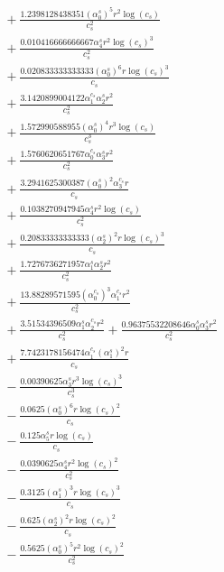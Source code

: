 \documentclass[10pt]{article}
\begin{document}
\begin{align*}
&{}  + \frac{1.2398128438351 \left(\alpha_{0}^s\right)^{5} r^{2} \log{\left(c_{s} \right)}}{c_{s}^{2}} \\
&{}  + \frac{0.010416666666667 \alpha_{4}^s r^{2} \log{\left(c_{s} \right)}^{3}}{c_{s}^{2}} \\
&{}  + \frac{0.020833333333333 \left(\alpha_{0}^s\right)^{6} r \log{\left(c_{s} \right)}^{3}}{c_{s}} \\
&{}  + \frac{3.1420899004122 \alpha_{1}^{c_s} \alpha_{2}^s r^{2}}{c_{s}^{2}} \\
&{}  + \frac{1.572990588955 \left(\alpha_{0}^s\right)^{4} r^{3} \log{\left(c_{s} \right)}}{c_{s}^{3}} \\
&{}  + \frac{1.5760620651767 \alpha_{0}^{c_s} \alpha_{3}^s r^{2}}{c_{s}^{2}} \\
&{}  + \frac{3.2941625300387 \left(\alpha_{0}^s\right)^{2} \alpha_{3}^{c_s} r}{c_{s}} \\
&{}  + \frac{0.1038270947945 \alpha_{4}^s r^{2} \log{\left(c_{s} \right)}}{c_{s}^{2}} \\
&{}  + \frac{0.20833333333333 \left(\alpha_{2}^s\right)^{2} r \log{\left(c_{s} \right)}^{3}}{c_{s}} \\
&{}  + \frac{1.7276736271957 \alpha_{1}^s \alpha_{2}^s r^{2}}{c_{s}^{2}} \\
&{}  + \frac{13.88289571595 \left(\alpha_{0}^{c_s}\right)^{3} \alpha_{1}^{c_s} r^{2}}{c_{s}^{2}} \\
&{}  + \frac{3.51534396509 \alpha_{1}^s \alpha_{2}^{c_s} r^{2}}{c_{s}^{2}} + \frac{0.96375532208646 \alpha_{0}^s \alpha_{3}^s r^{2}}{c_{s}^{2}} \\
&{}  + \frac{7.7423178156474 \alpha_{1}^{c_s} \left(\alpha_{1}^s\right)^{2} r}{c_{s}} \\
&{}  - \frac{0.00390625 \alpha_{3}^s r^{3} \log{\left(c_{s} \right)}^{3}}{c_{s}^{3}} \\
&{}  - \frac{0.0625 \left(\alpha_{0}^s\right)^{6} r \log{\left(c_{s} \right)}^{2}}{c_{s}} \\
&{}  - \frac{0.125 \alpha_{5}^s r \log{\left(c_{s} \right)}}{c_{s}} \\
&{}  - \frac{0.0390625 \alpha_{4}^s r^{2} \log{\left(c_{s} \right)}^{2}}{c_{s}^{2}} \\
&{}  - \frac{0.3125 \left(\alpha_{1}^s\right)^{3} r \log{\left(c_{s} \right)}^{3}}{c_{s}} \\
&{}  - \frac{0.625 \left(\alpha_{2}^s\right)^{2} r \log{\left(c_{s} \right)}^{2}}{c_{s}} \\
&{}  - \frac{0.5625 \left(\alpha_{0}^s\right)^{5} r^{2} \log{\left(c_{s} \right)}^{2}}{c_{s}^{2}} \\

\end{align*}
\end{document}
